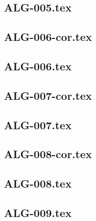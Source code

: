\renewcommand{\xxexo}{ALG-005.tex} 
\subsection*{\xxexo} 
\graphicspath{{../../exosalgo/equadiffs/\xxexo/}}
 
 
\renewcommand{\xxexo}{ALG-006-cor.tex} 
\subsection*{\xxexo} 
\graphicspath{{../../exosalgo/equadiffs/\xxexo/}}
 
 
\renewcommand{\xxexo}{ALG-006.tex} 
\subsection*{\xxexo} 
\graphicspath{{../../exosalgo/equadiffs/\xxexo/}}
 
 
\renewcommand{\xxexo}{ALG-007-cor.tex} 
\subsection*{\xxexo} 
\graphicspath{{../../exosalgo/equadiffs/\xxexo/}}
 
 
\renewcommand{\xxexo}{ALG-007.tex} 
\subsection*{\xxexo} 
\graphicspath{{../../exosalgo/equadiffs/\xxexo/}}
 
 
\renewcommand{\xxexo}{ALG-008-cor.tex} 
\subsection*{\xxexo} 
\graphicspath{{../../exosalgo/equadiffs/\xxexo/}}
 
 
\renewcommand{\xxexo}{ALG-008.tex} 
\subsection*{\xxexo} 
\graphicspath{{../../exosalgo/equadiffs/\xxexo/}}
 
 
\renewcommand{\xxexo}{ALG-009.tex} 
\subsection*{\xxexo} 
\graphicspath{{../../exosalgo/equadiffs/\xxexo/}}
 
 
